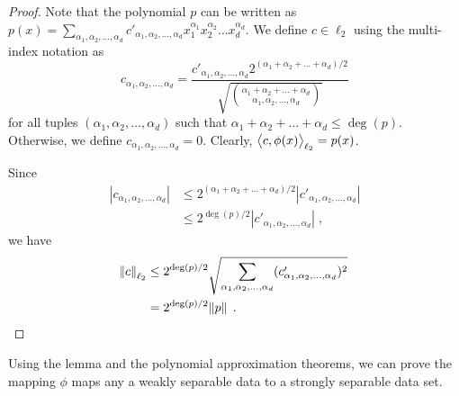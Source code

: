 \begin{proof}
Note that the polynomial $p$ can be written as
$p(x) = \sum_{\alpha_1, \alpha_2, \dots, \alpha_d} c'_{\alpha_1, \alpha_2, \dots, \alpha_d} x_1^{\alpha_1} x_2^{\alpha_2} \dots x_d^{\alpha_d}$.
We define $c \in \ell_2$ using the multi-index notation as
$$
c_{\alpha_1, \alpha_2, \dots, \alpha_d}
= \frac{c'_{\alpha_1, \alpha_2, \dots, \alpha_d} 2^{(\alpha_1 + \alpha_2 + \dots + \alpha_d)/2}}{\sqrt{\binom{\alpha_1 + \alpha_2 + \dots + \alpha_d}{\alpha_1, \alpha_2, \dots, \alpha_d}}}
$$
for all tuples $(\alpha_1, \alpha_2, \dots, \alpha_d)$ such that $\alpha_1 + \alpha_2 + \dots + \alpha_d \le \deg(p)$.
Otherwise, we define $c_{\alpha_1, \alpha_2, \dots, \alpha_d} = 0$. Clearly,
$\left\langle c, \phi(x) \right\rangle_{\ell_2} = p(x)$.

Since
\begin{align*}
|c_{\alpha_1, \alpha_2, \dots, \alpha_d}|
& \le 2^{(\alpha_1 + \alpha_2 + \dots + \alpha_d)/2} |c'_{\alpha_1, \alpha_2, \dots, \alpha_d}| \\
& \le 2^{\deg(p)/2} |c'_{\alpha_1, \alpha_2, \dots, \alpha_d}| \; ,
\end{align*}
we have
\begin{align*}
\norm{c}_{\ell_2}
& \le 2^{\deg(p)/2} \sqrt{\sum_{\alpha_1, \alpha_2, \dots, \alpha_d} (c'_{\alpha_1, \alpha_2, \dots, \alpha_d})^2} \\
& = 2^{\deg(p)/2} \norm{p} \; . \qquad \qedhere
\end{align*}
\end{proof}

Using the lemma and the polynomial approximation theorems, we can prove the
mapping $\phi$ maps any a weakly separable data to a strongly separable data
set.

